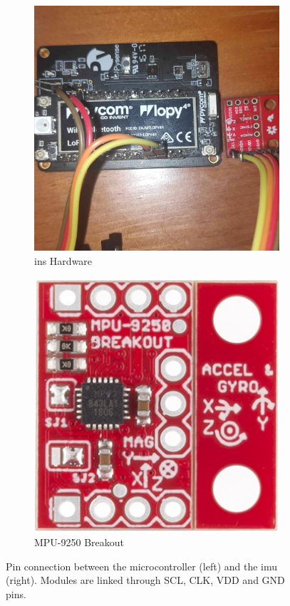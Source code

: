\begin{figure}[!h]
    \centering
    \begin{subfigure}{0.49\textwidth}
        \centering
        \includegraphics[width=1\textwidth]{figures/INS.jpg}
        \caption{\acrshort{ins} Hardware}
        \label{fig:ins_1}
    \end{subfigure}%
    \begin{subfigure}{0.49\textwidth}
        \centering
        \includegraphics[width=1\textwidth]{figures/mpu9250.jpg}
        \caption{MPU-9250 Breakout}
        \label{fig:ins_2}
    \end{subfigure}
    \caption{Pin connection between the microcontroller (left) and the \acrshort{imu} (right). Modules are linked through SCL, CLK, VDD and GND pins.}
    \label{fig:hardware}
\end{figure}

